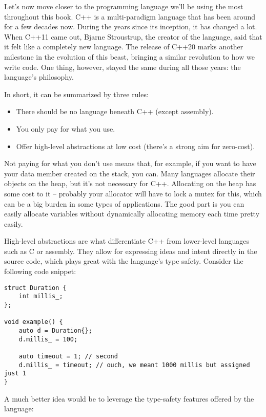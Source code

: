 Let's now move closer to the programming language we'll be using the most throughout this book. C++ is a multi-paradigm language that has been around for a few decades now. During the years since its inception, it has changed a lot. When C++11 came out, Bjarne Stroustrup, the creator of the language, said that it felt like a completely new language. The release of C++20 marks another milestone in the evolution of this beast, bringing a similar revolution to how we write code. One thing, however, stayed the same during all those years: the language's philosophy.

In short, it can be summarized by three rules:

\begin{itemize}
\item There should be no language beneath C++ (except assembly).
\item You only pay for what you use.
\item Offer high-level abstractions at low cost (there's a strong aim for zero-cost).
\end{itemize}

Not paying for what you don't use means that, for example, if you want to have your data member created on the stack, you can. Many languages allocate their objects on the heap, but it's not necessary for C++. Allocating on the heap has some cost to it – probably your allocator will have to lock a mutex for this, which can be a big burden in some types of applications. The good part is you can easily allocate variables without dynamically allocating memory each time pretty easily.

High-level abstractions are what differentiate C++ from lower-level languages such as C or assembly. They allow for expressing ideas and intent directly in the source code, which plays great with the language's type safety. Consider the following code snippet:


\begin{lstlisting}[style=styleCXX]
struct Duration {
	int millis_;
};

void example() {
	auto d = Duration{};
	d.millis_ = 100;
	
	auto timeout = 1; // second
	d.millis_ = timeout; // ouch, we meant 1000 millis but assigned just 1
}

\end{lstlisting}

A much better idea would be to leverage the type-safety features offered by the language:

